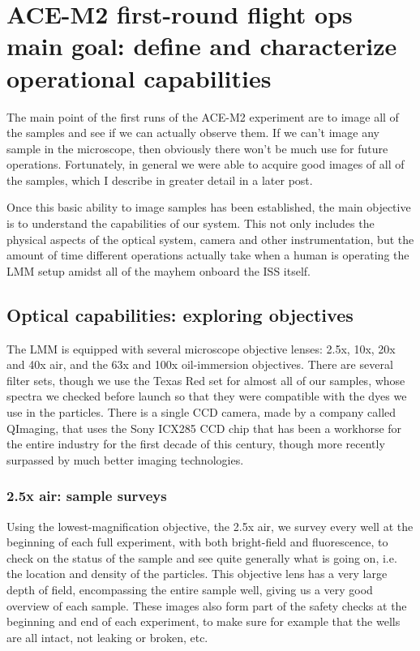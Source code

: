 \section{ACE-M2 first-round flight ops main goal: define and characterize operational capabilities}\hypertarget{ace-m2-first-round-flight-ops-main-goal-define-and-characterize-operational-capabilities}{}\label{ace-m2-first-round-flight-ops-main-goal-define-and-characterize-operational-capabilities}
The main point of the first runs of the ACE-M2 experiment are to image all of
the samples and see if we can actually observe them. If we can't image any
sample in the microscope, then obviously there won't be much use for future
operations. Fortunately, in general we were able to acquire good images of all
of the samples, which I describe in greater detail in a {later post}.

Once this basic ability to image samples has been established, the main objective is to understand the capabilities of our system. This not only includes the physical aspects of the optical system, camera and other instrumentation, but the amount of time different operations actually take when a human is operating the LMM setup amidst all of the mayhem onboard the ISS itself.

\subsection{Optical capabilities: exploring objectives}\hypertarget{optical-capabilities-exploring-objectives}{}\label{optical-capabilities-exploring-objectives}
The LMM is equipped with several microscope objective lenses: 2.5x, 10x, 20x and
40x air, and the 63x and 100x oil-immersion objectives. There are several filter
sets, though we use the Texas Red set for almost all of our samples, whose
spectra we checked before launch so that they were compatible with the dyes we
use in the particles. There is a single CCD camera, made by a company called
QImaging, that uses the Sony ICX285 CCD chip that has been a workhorse for the
entire industry for the first decade of this century, though more recently
surpassed by much better imaging technologies.

\subsubsection{2.5x air: sample surveys}\hypertarget{x-air-sample-surveys}{}\label{x-air-sample-surveys}
Using the lowest-magnification objective, the 2.5x air, we survey every well at
the beginning of each full experiment, with both bright-field and fluorescence,
to check on the status of the sample and see quite generally what is going on,
i.e. the location and density of the particles. This objective lens has a very
large depth of field, encompassing the entire sample well, giving us a very good
overview of each sample. These images also form part of the safety checks at the
beginning and end of each experiment, to make sure for example that the wells
are all intact, not leaking or broken, etc.

